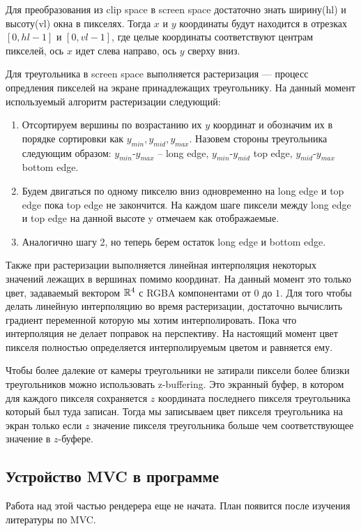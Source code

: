 \documentclass{article}
\begin{document}
Для преобразования из clip space в screen space достаточно 
знать ширину(hl) и высоту(vl) окна в пикселях.
Тогда $x$ и $y$ координаты будут находится в отрезках $[0, hl - 1]$ и $[0, vl - 1]$, 
где целые координаты соответствуют центрам пикселей, ось 
$x$ идет слева направо, ось $y$ сверху вниз.

Для треугольника в screen space выполняется растеризация ---
процесс опредления пикселей на экране принадлежащих треугольнику.
На данный момент используемый алгоритм растеризации следующий:

\begin{enumerate}
    \item Отсортируем вершины по возрастанию их $y$ координат и обозначим 
    их в порядке сортировки как $y_{min}, y_{mid}, y_{max}$. Назовем 
    стороны треугольника следующим образом: $y_{min}$-$y_{max}$ -- long edge, 
    $y_{min}$-$y_{mid}$ top edge, $y_{mid}$-$y_{max}$ bottom edge.
    \item Будем двигаться по одному пикселю вниз одновременно на long edge и 
    top edge пока top edge не закончится. На каждом шаге пиксели между long 
    edge и top edge на данной высоте y отмечаем как отображаемые.
    \item Аналогично шагу 2, но теперь берем остаток long edge и bottom edge.
\end{enumerate}

Также при растеризации выполняется линейная интерполяция некоторых значений 
лежащих в вершинах помимо координат. На данный момент это только цвет, задаваемый 
вектором $\mathbb{R}^4$ с RGBA компонентами от $0$ до $1$. Для того чтобы делать 
линейную интерполяцию во время растеризации, достаточно вычислить градиент переменной 
которую мы хотим интерполировать. Пока что интерполяция не делает поправок на перспективу.
На настоящий момент цвет пикселя полностью определяется интерполируемым цветом и 
равняется ему. 

Чтобы более далекие от камеры треугольники не затирали пиксели 
более близки треугольников можно использовать z-buffering. Это 
экранный буфер, в котором для каждого пикселя сохраняется $z$ координата 
последнего пикселя треугольника который был туда записан. Тогда 
мы записываем цвет пикселя треугольника на экран только если $z$ 
значение пикселя треугольника больше чем соответствующее значение 
в $z$-буфере.

\subsection{Устройство MVC в программе}
Работа над этой частью рендерера еще не начата. 
План появится после изучения литературы по MVC.


\nocite{OpenGLMath}
\nocite{GameMath}
\nocite{CompGraphicsDynamic}
\nocite{CompGraphicsPolyg}



\end{document}
